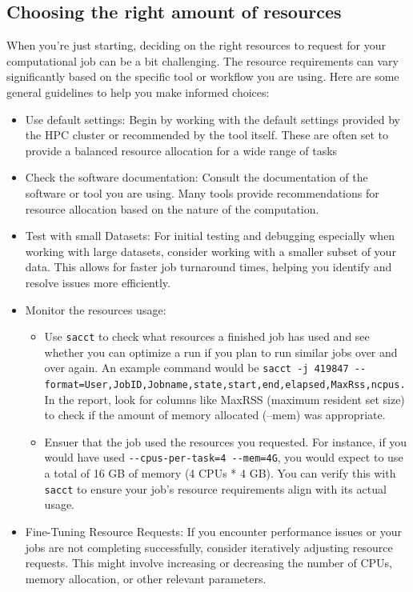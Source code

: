 \documentclass[
  letterpaper,
  DIV=11,
  numbers=noendperiod]{scrreprt}
\providecommand{\tightlist}{%
  \setlength{\itemsep}{0pt}\setlength{\parskip}{0pt}}\usepackage{longtable,booktabs,array}
\begin{document}
\subsection{Choosing the right amount of
resources}\label{choosing-the-right-amount-of-resources}

When you're just starting, deciding on the right resources to request
for your computational job can be a bit challenging. The resource
requirements can vary significantly based on the specific tool or
workflow you are using. Here are some general guidelines to help you
make informed choices:

\begin{itemize}
\tightlist
\item
  Use default settings: Begin by working with the default settings
  provided by the HPC cluster or recommended by the tool itself. These
  are often set to provide a balanced resource allocation for a wide
  range of tasks
\item
  Check the software documentation: Consult the documentation of the
  software or tool you are using. Many tools provide recommendations for
  resource allocation based on the nature of the computation.
\item
  Test with small Datasets: For initial testing and debugging especially
  when working with large datasets, consider working with a smaller
  subset of your data. This allows for faster job turnaround times,
  helping you identify and resolve issues more efficiently.
\item
  Monitor the resources usage:

  \begin{itemize}
  \tightlist
  \item
    Use \texttt{sacct} to check what resources a finished job has used
    and see whether you can optimize a run if you plan to run similar
    jobs over and over again. An example command would be
    \texttt{sacct\ -j\ 419847\ -\/-format=User,JobID,Jobname,state,start,end,elapsed,MaxRss,ncpus.}
    In the report, look for columns like MaxRSS (maximum resident set
    size) to check if the amount of memory allocated (--mem) was
    appropriate.
  \item
    Ensuer that the job used the resources you requested. For instance,
    if you would have used \texttt{-\/-cpus-per-task=4\ -\/-mem=4G}, you
    would expect to use a total of 16 GB of memory (4 CPUs * 4 GB). You
    can verify this with \texttt{sacct} to ensure your job's resource
    requirements align with its actual usage.
  \end{itemize}
\item
  Fine-Tuning Resource Requests: If you encounter performance issues or
  your jobs are not completing successfully, consider iteratively
  adjusting resource requests. This might involve increasing or
  decreasing the number of CPUs, memory allocation, or other relevant
  parameters.
\end{itemize}
\end{document}
